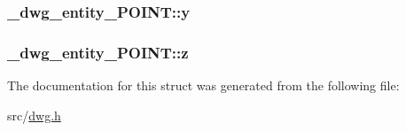 \hypertarget{struct__dwg__entity__POINT_a372a513258a3f3b6613573af0b572875}{
\subsubsection[{y}]{ {\bf \-\_\-dwg\-\_\-entity\-\_\-\-P\-O\-I\-N\-T\-::y}}}\label{struct__dwg__entity__POINT_a372a513258a3f3b6613573af0b572875}
\hypertarget{struct__dwg__entity__POINT_ad77dd3b3c0eeb97dd830e61b04b4dd38}{
\subsubsection[{z}]{ {\bf \-\_\-dwg\-\_\-entity\-\_\-\-P\-O\-I\-N\-T\-::z}}}\label{struct__dwg__entity__POINT_ad77dd3b3c0eeb97dd830e61b04b4dd38}


\-The documentation for this struct was generated from the following file\-:\begin{DoxyCompactItemize}
\item 
src/\hyperlink{dwg_8h}{dwg.\-h}\end{DoxyCompactItemize}
